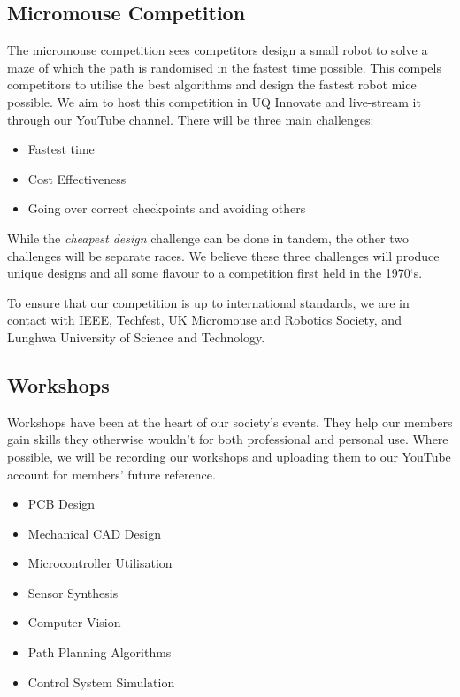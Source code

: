 \documentclass[a4paper,12pt]{report}
\begin{document}
\subsection*{Micromouse Competition}
The micromouse competition sees competitors design a small robot to solve a maze of which the path is randomised in the fastest time possible.
This compels competitors to utilise the best algorithms and design the fastest robot mice possible. We aim to host this competition in UQ Innovate and live-stream it through our YouTube channel.
There will be three main challenges:
\begin{itemize}
    \item Fastest time
    \item Cost Effectiveness 
    \item Going over correct checkpoints and avoiding others
\end{itemize}
While the \textit{cheapest design} challenge can be done in tandem, the other two challenges will be separate races. We believe these three challenges will produce unique designs and all some flavour to a competition first held in the 1970`s.

To ensure that our competition is up to international standards, we are in contact with IEEE, Techfest, UK Micromouse and Robotics Society, and Lunghwa University of Science and Technology. 
    
\newpage

\subsection*{Workshops}

Workshops have been at the heart of our society's events. They help our members gain skills they otherwise wouldn't for both professional and personal use.
Where possible, we will be recording our workshops and uploading them to our YouTube account for members' future reference.

\begin{itemize}
    \item PCB Design   
    \item Mechanical CAD Design
    \item Microcontroller Utilisation
    \item Sensor Synthesis
    \item Computer Vision
    \item Path Planning Algorithms
    \item Control System Simulation
\end{itemize}
\end{document}
